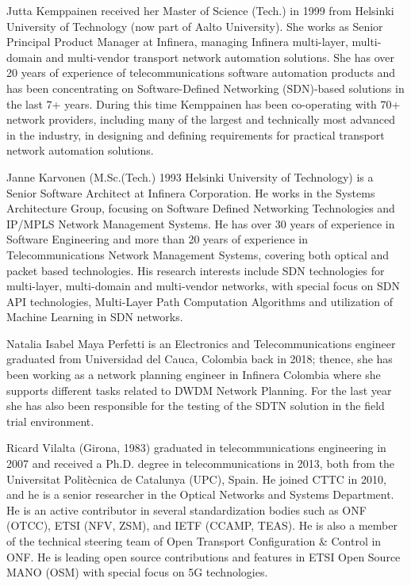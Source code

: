 \documentclass[a4paper,fleqn]{cas-dc}
\begin{document}
Jutta Kemppainen received her Master of Science (Tech.) in 1999 from Helsinki University of Technology (now part of Aalto University). She works as Senior Principal Product Manager at Infinera, managing Infinera multi-layer, multi-domain and multi-vendor transport network automation solutions. She has over 20 years of experience of telecommunications software automation products and has been concentrating on Software-Defined Networking (SDN)-based solutions in the last 7+ years. During this time Kemppainen has been co-operating with 70+ network providers, including many of the largest and technically most advanced in the industry, in designing and defining requirements for practical transport network automation solutions.
\endbio

Janne Karvonen (M.Sc.(Tech.) 1993 Helsinki University of Technology) is a Senior Software Architect at Infinera Corporation. He works in the Systems Architecture Group, focusing on Software Defined Networking Technologies and IP/MPLS Network Management Systems. He has over 30 years of experience in Software Engineering and more than 20 years of experience in Telecommunications Network Management Systems, covering both optical and packet based technologies. His research interests include SDN technologies for multi-layer, multi-domain and multi-vendor networks, with special focus on SDN API technologies, Multi-Layer Path Computation Algorithms and utilization of Machine Learning in SDN networks.
\endbio

Natalia Isabel Maya Perfetti is an Electronics and Telecommunications engineer graduated from Universidad del Cauca, Colombia back in 2018; thence, she has been working as a network planning engineer in Infinera Colombia where she supports different tasks related to DWDM Network Planning. For the last year she has also been responsible for the testing of the SDTN solution in the field trial environment.
\endbio

Ricard Vilalta (Girona, 1983) graduated in telecommunications engineering in 2007 and received a Ph.D. degree in telecommunications in 2013, both from the Universitat Politècnica de Catalunya (UPC), Spain. He joined CTTC in 2010, and he is a senior researcher in the Optical Networks and Systems Department. He is an active contributor in several standardization bodies such as ONF (OTCC), ETSI (NFV, ZSM), and IETF (CCAMP, TEAS). He is also a member of the technical steering team of Open Transport Configuration \& Control in ONF. He is leading open source contributions and features in ETSI Open Source MANO (OSM) with special focus on 5G technologies.
\endbio
\end{document}
